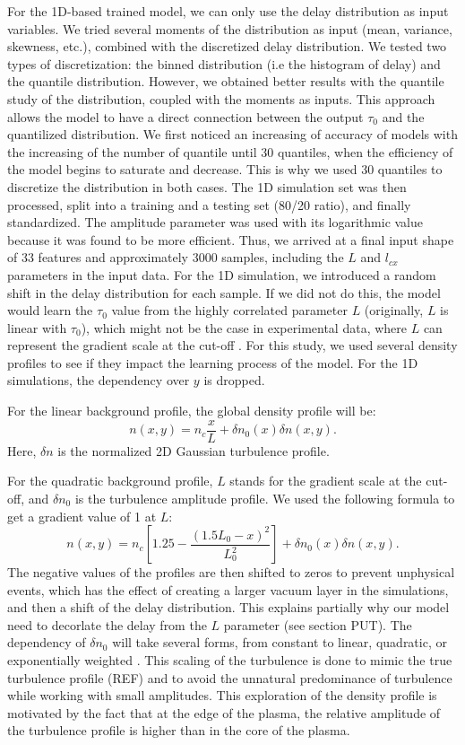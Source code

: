 \documentclass[11pt,openany]{report}
\begin{document}
\begin{multicols}{2}
    For the 1D-based trained model, we can only use the delay distribution as input variables. We tried several moments of the distribution as input (mean, variance, skewness, etc.), combined with the discretized delay distribution. We tested two types of discretization: the binned distribution (i.e the histogram of delay) and the quantile distribution. However, we obtained better results with the quantile study of the distribution, coupled with the moments as inputs. This approach allows the model to have a direct connection between the output $\tau_0$ and the quantilized distribution. We first noticed an increasing of accuracy of models with the increasing of the number of quantile until 30 quantiles, when the efficiency of the model begins to saturate and decrease. This is why we used 30 quantiles to discretize the distribution in both cases. The 1D simulation set was then processed, split into a training and a testing set (80/20 ratio), and finally standardized. The amplitude parameter was used with its logarithmic value because it was found to be more efficient. Thus, we arrived at a final input shape of 33 features and approximately 3000 samples, including the $L$ and $l_{cx}$ parameters in the input data. For the 1D simulation, we introduced a random shift in the delay distribution for each sample. If we did not do this, the model would learn the $\tau_0$ value from the highly correlated parameter $L$ (originally, $L$ is linear with $\tau_0$), which might not be the case in experimental data, where $L$ can represent the gradient scale at the cut-off \cite{Krutkin_thesis}. For this study, we used several density profiles to see if they impact the learning process of the model. For the 1D simulations, the dependency over $y$ is dropped.

    For the linear background profile, the global density profile will be:
    $$n(x,y) = n_c \frac{x}{L} + \delta n_0(x) \delta n(x,y).$$
    Here, $\delta n$ is the normalized 2D Gaussian turbulence profile.

    For the quadratic background profile, $L$ stands for the gradient scale at the cut-off, and $\delta n_0$ is the turbulence amplitude profile. We used the following formula to get a gradient value of 1 at $L$:
    $$n(x,y) = n_c \left[1.25 - \frac{(1.5L_0 - x)^2}{L_0^2} \right] + \delta n_0(x) \delta n(x,y).$$
    The negative values of the profiles are then shifted to zeros to prevent unphysical events, which has the effect of creating a larger vacuum layer in the simulations, and then a shift of the delay distribution. This explains partially why our model need to decorlate the delay from the $L$ parameter (see section PUT). The dependency of $\delta n_0$ will take several forms, from constant to linear, quadratic, or exponentially weighted \cite{SPR_Krutkin}. This scaling of the turbulence is done to mimic the true turbulence profile (REF) and to avoid the unnatural predominance of turbulence while working with small amplitudes. This exploration of the density profile is motivated by the fact that at the edge of the plasma, the relative amplitude of the turbulence profile is higher than in the core of the plasma.


\end{multicols}
\end{document}
